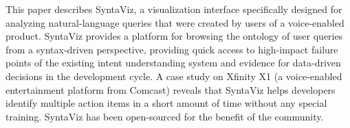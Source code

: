 This paper describes SyntaViz, a visualization interface specifically designed for analyzing natural-language queries that were created by users of a voice-enabled product. SyntaViz provides a platform for browsing the ontology of user queries from a syntax-driven perspective, providing quick access to high-impact failure points of the existing intent understanding system and evidence for data-driven decisions in the development cycle. A case study on Xfinity X1 (a voice-enabled entertainment platform from Comcast) reveals that SyntaViz helps developers identify multiple action items in a short amount of time without any special training. SyntaViz has been open-sourced for the benefit of the community.
